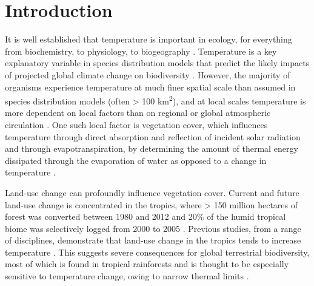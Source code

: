 \documentclass[12pt,a4paper,]{report}
\theoremstyle{definition}
\theoremstyle{definition}
\theoremstyle{definition}
\theoremstyle{remark}
\begin{document}
\section{Introduction}\label{introduction}

It is well established that temperature is important in ecology, for
everything from biochemistry, to physiology, to biogeography
\citep{thomas_extinction_2004, kearney_potential_2009, kingsolver_welltemperatured_2009, puurtinen_temperature-dependent_2015}.
Temperature is a key explanatory variable in species distribution models
that predict the likely impacts of projected global climate change on
biodiversity \citep[e.g.][]{thomas_extinction_2004}. However, the
majority of organisms experience temperature at much finer spatial scale
\citep{gillingham_relative_2010, suggitt_habitat_2011} than assumed in
species distribution models (often \textgreater{} 100
km\textsuperscript{2}), and at local scales temperature is more
dependent on local factors \citep{suggitt_habitat_2011} than on regional
or global atmospheric circulation
\citep{oke_boundary_1987, davin_climatic_2010, wiens_matching_2010, pielke_land_2011}.
One such local factor is vegetation cover, which influences temperature
through direct absorption and reflection of incident solar radiation
\citep{oke_boundary_1987, murcia_edge_1995, snyder_analyzing_2004} and
through evapotranspiration, by determining the amount of thermal energy
dissipated through the evaporation of water as opposed to a change in
temperature
\citep{oke_boundary_1987, findell_modeled_2007, lawrence_effects_2015}.

Land-use change can profoundly influence vegetation cover. Current and
future land-use change is concentrated in the tropics, where
\textgreater{} 150 million hectares of forest was converted between 1980
and 2012 \citep{gibbs_tropical_2010, hansen_high-resolution_2013} and
20\% of the humid tropical biome was selectively logged from 2000 to
2005 \citep{asner_contemporary_2009}. Previous studies, from a range of
disciplines, demonstrate that land-use change in the tropics tends to
increase temperature
\citep{findell_modeled_2007, loarie_velocity_2009, davin_climatic_2010, luskin_microclimate_2011, pielke_land_2011, ramdani_local_2014, lawrence_effects_2015}.
This suggests severe consequences for global terrestrial biodiversity,
most of which is found in tropical rainforests
\citep{myers_biodiversity_2000} and is thought to be especially
sensitive to temperature change, owing to narrow thermal limits
\citep{deutsch_impacts_2008, tewksbury_putting_2008, kingsolver_welltemperatured_2009}.
\end{document}
